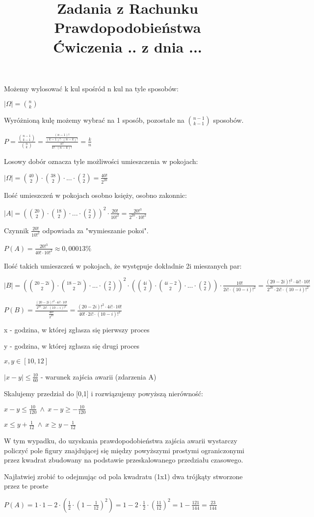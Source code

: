 \documentclass[fleqn]{article}
\begin{document}
\title{Zadania z Rachunku Prawdopodobieństwa \\ Ćwiczenia .. z dnia ...}
\date{}
\medskip
{}
\medskip

Możemy wylosować k kul spośród n kul na tyle sposobów:

$|\Omega|={n\choose k}$

Wyróżnioną kulę możemy wybrać na 1 sposób, pozostałe na ${n-1\choose k-1}$ sposobów.

$P=\frac{{n-1\choose k-1}}{{n\choose k}}=\frac{\frac{(n-1)!}{(k-1)!\cdot(n-k)!}}{\frac{n!}{k!\cdot(n-k)!}}=\frac{k}{n}$

\medskip
{}
\medskip

Losowy dobór oznacza tyle możliwości umieszczenia w pokojach:

$|\Omega|={40\choose 2}\cdot{38\choose 2}\cdot...\cdot{2\choose 2}=\frac{40!}{2^{20}}$

Ilość umieszczeń w pokojach osobno księży, osobno zakonnic:

$|A|=\left({20\choose 2}\cdot{18\choose 2}\cdot...\cdot{2\choose 2}\right)^{2}\cdot\frac{20!}{10!^2}=\frac{20!^3}{2^{20}\cdot10!^2}$

Czynnik $\frac{20!}{10!^2}$ odpowiada za "wymieszanie pokoi".

$P(A)=\frac{20!^3}{40!\cdot10!^2}\approx0,00013\%$

Ilość takich umieszczeń w pokojach, że występuje dokładnie 2i mieszanych par:

$|B|=\left({20-2i\choose 2}\cdot{18-2i\choose 2}\cdot...\cdot{2\choose 2}\right)^{2}\cdot\left({4i\choose 2}\cdot{4i-2\choose 2}\cdot...\cdot{2\choose 2}\right)\cdot\frac{10!}{2i!\cdot(10-i)!^2}=\frac{(20-2i)!^2\cdot4i!\cdot10!}{2^{20}\cdot2i!\cdot(10-i)!^2}$

$P(B)=\frac{\frac{(20-2i)!^2\cdot4i!\cdot10!}{2^{20}\cdot2i!\cdot(10-i)!^2}}{\frac{40!}{2^{20}}}=\frac{(20-2i)!^2\cdot4i!\cdot10!}{40!\cdot2i!\cdot(10-i)!^2}$

\medskip
{}
\medskip

x - godzina, w której zgłasza się pierwszy proces

y - godzina, w której zgłasza się drugi proces

$x,y \in [10,12]$

$|x-y|\le\frac{10}{60}$ - warunek zajścia awarii (zdarzenia A)

Skalujemy przedział do [0,1] i rozwiązujemy powyższą nierówność:

$x-y\le\frac{10}{120} \ \wedge \ x-y\ge-\frac{10}{120}$

$x\le y+\frac{1}{12} \ \wedge \ x\ge y-\frac{1}{12}$

W tym wypadku, do uzyskania prawdopodobieństwa zajścia awarii wystarczy policzyć pole figury znajdującej się między powyższymi prostymi ograniczonymi przez kwadrat zbudowany na podstawie przeskalowanego przedziału czasowego.

Najłatwiej zrobić to odejmując od pola kwadratu (1x1) dwa trójkąty stworzone przez te proste

$P(A)=1\cdot1-2\cdot(\frac{1}{2}\cdot(1-\frac{1}{12})^{2})=1-2\cdot\frac{1}{2}\cdot(\frac{11}{12})^{2}=1-\frac{121}{144}=\frac{23}{144}$
\end{document}
